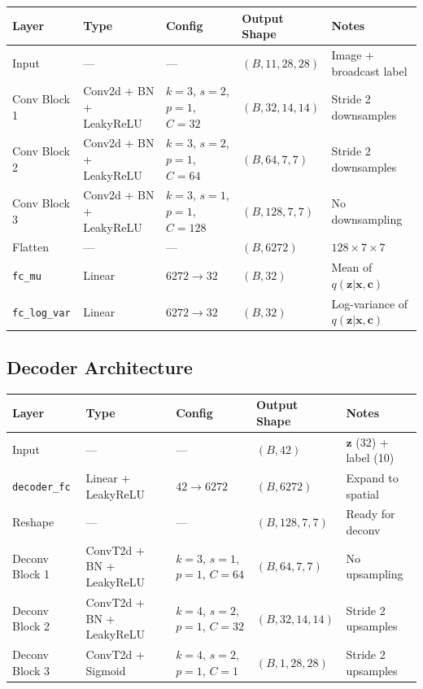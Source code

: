 \documentclass[11pt,a4paper]{article}
\begin{document}
\begin{center}
\begin{tabular}{lllll}
\toprule
\textbf{Layer} & \textbf{Type} & \textbf{Config} & \textbf{Output Shape} & \textbf{Notes} \\
\midrule
Input & --- & --- & $(B, 11, 28, 28)$ & Image + broadcast label \\
Conv Block 1 & Conv2d + BN + LeakyReLU & $k\!=\!3$, $s\!=\!2$, $p\!=\!1$, $C\!=\!32$ & $(B, 32, 14, 14)$ & Stride 2 downsamples \\
Conv Block 2 & Conv2d + BN + LeakyReLU & $k\!=\!3$, $s\!=\!2$, $p\!=\!1$, $C\!=\!64$ & $(B, 64, 7, 7)$ & Stride 2 downsamples \\
Conv Block 3 & Conv2d + BN + LeakyReLU & $k\!=\!3$, $s\!=\!1$, $p\!=\!1$, $C\!=\!128$ & $(B, 128, 7, 7)$ & No downsampling \\
Flatten & --- & --- & $(B, 6272)$ & $128 \times 7 \times 7$ \\
\texttt{fc\_mu} & Linear & $6272 \to 32$ & $(B, 32)$ & Mean of $q(\mathbf{z}|\mathbf{x}, \mathbf{c})$ \\
\texttt{fc\_log\_var} & Linear & $6272 \to 32$ & $(B, 32)$ & Log-variance of $q(\mathbf{z}|\mathbf{x}, \mathbf{c})$ \\
\bottomrule
\end{tabular}
\end{center}

\subsection{Decoder Architecture}

\begin{center}
\begin{tabular}{lllll}
\toprule
\textbf{Layer} & \textbf{Type} & \textbf{Config} & \textbf{Output Shape} & \textbf{Notes} \\
\midrule
Input & --- & --- & $(B, 42)$ & $\mathbf{z}$ (32) + label (10) \\
\texttt{decoder\_fc} & Linear + LeakyReLU & $42 \to 6272$ & $(B, 6272)$ & Expand to spatial \\
Reshape & --- & --- & $(B, 128, 7, 7)$ & Ready for deconv \\
Deconv Block 1 & ConvT2d + BN + LeakyReLU & $k\!=\!3$, $s\!=\!1$, $p\!=\!1$, $C\!=\!64$ & $(B, 64, 7, 7)$ & No upsampling \\
Deconv Block 2 & ConvT2d + BN + LeakyReLU & $k\!=\!4$, $s\!=\!2$, $p\!=\!1$, $C\!=\!32$ & $(B, 32, 14, 14)$ & Stride 2 upsamples \\
Deconv Block 3 & ConvT2d + Sigmoid & $k\!=\!4$, $s\!=\!2$, $p\!=\!1$, $C\!=\!1$ & $(B, 1, 28, 28)$ & Stride 2 upsamples \\
\bottomrule
\end{tabular}
\end{center}
\end{document}
